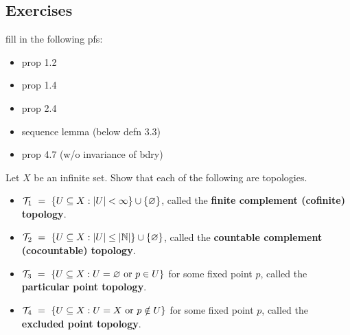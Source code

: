 \subsection{Exercises}

\begin{exr}[source=Primary Source Material]
    fill in the following pfs:
    \begin{itemize}
        \item prop 1.2
        \item prop 1.4
        \item prop 2.4
        \item sequence lemma (below defn 3.3)
        \item prop 4.7 (w/o invariance of bdry)
    \end{itemize}
\end{exr}

\begin{exr}[source=Primary Source Material]
    Let $ X $ be an infinite set. Show that each of the following are topologies.
    \begin{itemize}
        \item $ \mathcal{T}_{1} \ = \ \left\{{U \subseteq X: \abs{U} < \infty}\right\} \cup
            \left\{{\varnothing}\right\} $, called the \textbf{finite complement (cofinite)
            topology}.
        \item $ \mathcal{T}_{2} \ = \ \left\{{U \subseteq X: \abs{U} \leq \abs{\mathbb{N}}}\right\} \cup
            \left\{{\varnothing}\right\} $, called the \textbf{countable complement (cocountable)
            topology}.
        \item $ \mathcal{T}_{3} \ = \ \left\{{U \subseteq X: U = \varnothing \textrm{ or } p \in
            U}\right\} $ for some fixed point $ p $, called the \textbf{particular point
            topology}.
        \item $ \mathcal{T}_{4} \ = \ \left\{{U \subseteq X: U = X \textrm{ or } p \notin
            U}\right\} $ for some fixed point $ p $, called the \textbf{excluded point
            topology}.
    \end{itemize}
\end{exr}

